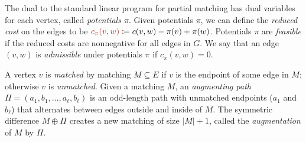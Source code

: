 \documentclass[a4paper,UKenglish]{socg-lipics-v2018}
\makeatletter
\def\abs#1{\mathopen| #1 \mathclose|}		%
\def\norm#1{\mathopen\| #1 \mathclose\|}	%
\theoremstyle{plain}
\numberwithin{figure}{section}
\def\EMPH#1{\textcolor{BrickRed}{{\emph{#1}}}}
\def\n@te#1{\textsf{\boldmath \textbf{$\langle\!\langle$#1$\rangle\!\rangle$}}\leavevmode}
\def\note#1{\textcolor{red}{\n@te{#1}}}
\makeatother
\begin{document}

The dual to the standard linear program for partial matching has dual variables
for each vertex, called \EMPH{potentials $\pi$}.
Given potentials $\pi$, we can define the \EMPH{reduced cost} on the edges to be
$\EMPH{$c_\pi(v, w)$} \coloneqq c(v, w) - \pi(v) + \pi(w)$.
Potentials $\pi$ are \EMPH{feasible} if the reduced costs are nonnegative for all edges in $G$.
We say that an edge $(v, w)$ is \EMPH{admissible} under potentials $\pi$ if $c_\pi(v, w) = 0$.

A vertex $v$ is \EMPH{matched} by matching $M \subseteq E$ if $v$ is the endpoint of some edge in $M$;
otherwise $v$ is \EMPH{unmatched}.
Given a matching $M$, an \EMPH{augmenting path}
$\Pi = (a_1, b_1, \ldots, a_\ell, b_\ell)$ is an odd-length path with unmatched
endpoints ($a_1$ and $b_\ell$) that alternates between edges outside and inside of $M$.
The symmetric difference $M \oplus \Pi$ creates a new matching of size $\abs{M}+1$, called the \EMPH{augmentation} of $M$ by $\Pi$.
\end{document}

